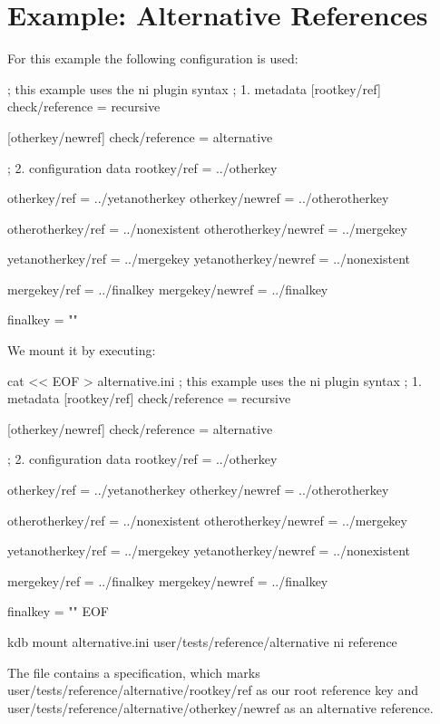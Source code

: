 \hypertarget{autotoc_md594_src_plugins_reference_examples_alternative_README_md}{}\section{Example\+: Alternative References}\label{autotoc_md594_src_plugins_reference_examples_alternative_README_md}
For this example the following configuration is used\+:


\begin{DoxyCode}
; this example uses the ni plugin syntax
; 1. metadata
[rootkey/ref]
check/reference = recursive

[otherkey/newref]
check/reference = alternative

; 2. configuration data
rootkey/ref = ../otherkey

otherkey/ref = ../yetanotherkey
otherkey/newref = ../otherotherkey

otherotherkey/ref = ../nonexistent
otherotherkey/newref = ../mergekey

yetanotherkey/ref = ../mergekey
yetanotherkey/newref = ../nonexistent

mergekey/ref = ../finalkey
mergekey/newref = ../finalkey

finalkey = ""
\end{DoxyCode}


We mount it by executing\+:


\begin{DoxyCode}
cat << EOF > alternative.ini
; this example uses the ni plugin syntax
; 1. metadata
[rootkey/ref]
check/reference = recursive

[otherkey/newref]
check/reference = alternative

; 2. configuration data
rootkey/ref = ../otherkey

otherkey/ref = ../yetanotherkey
otherkey/newref = ../otherotherkey

otherotherkey/ref = ../nonexistent
otherotherkey/newref = ../mergekey

yetanotherkey/ref = ../mergekey
yetanotherkey/newref = ../nonexistent

mergekey/ref = ../finalkey
mergekey/newref = ../finalkey

finalkey = ""
EOF

kdb mount alternative.ini user/tests/reference/alternative ni reference
\end{DoxyCode}


The file contains a specification, which marks {\ttfamily user/tests/reference/alternative/rootkey/ref} as our root reference key and {\ttfamily user/tests/reference/alternative/otherkey/newref} as an alternative reference.

